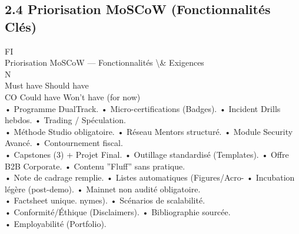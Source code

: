 \subsection{2.4 Priorisation MoSCoW (Fonctionnalités Clés)}
\vspace{0.5em}
\vspace{0.5em}
\vspace{0.5em}
\vspace{0.5em}
FI\\
Priorisation MoSCoW — Fonctionnalités \textbackslash{}& Exigences\\
\vspace{0.5em}
\vspace{0.5em}
\vspace{0.5em}
\vspace{0.5em}
N\\
Must have                             Should have\\
CO                          Could have                              Won’t have (for now)\\
• Programme DualTrack.                • Micro-certifications (Badges).       • Incident Drills hebdos.               • Trading / Spéculation.\\
• Méthode Studio obligatoire.         • Réseau Mentors structuré.            • Module Security Avancé.               • Contournement fiscal.\\
• Capstones (3) + Projet Final.       • Outillage standardisé (Templates).   • Offre B2B Corporate.                  • Contenu ”Fluff” sans pratique.\\
• Note de cadrage remplie.            • Listes automatiques (Figures/Acro-   • Incubation légère (post-demo).        • Mainnet non audité obligatoire.\\
• Factsheet unique.                   nymes).                                • Scénarios de scalabilité.\\
• Conformité/Éthique (Disclaimers).   • Bibliographie sourcée.\\
• Employabilité (Portfolio).\\
\vspace{0.5em}
\vspace{0.5em}
\vspace{0.5em}
\vspace{0.5em}
